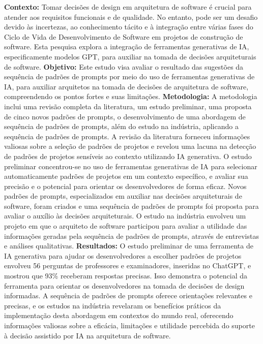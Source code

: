 \begin{abstractpt}
\textbf{Contexto:} Tomar decisões de design em arquitetura de software é crucial para atender aos requisitos funcionais e de qualidade. No entanto, pode ser um desafio devido às incertezas, ao conhecimento tácito e à integração entre várias fases do Ciclo de Vida de Desenvolvimento de Software em projetos de construção de software. Esta pesquisa explora a integração de ferramentas generativas de IA, especificamente modelos GPT, para auxiliar na tomada de decisões arquiteturais de software.
\textbf{Objetivo:} Este estudo visa avaliar o resultado das sugestões da sequência de padrões de prompts por meio do uso de ferramentas generativas de IA, para auxiliar arquitetos na tomada de decisões de arquitetura de software, compreendendo os pontos fortes e suas limitações.
\textbf{Metodologia:} A metodologia inclui uma revisão completa da literatura, um estudo preliminar, uma proposta de cinco novos padrões de prompts, o desenvolvimento de uma abordagem de sequência de padrões de prompts, além do estudo na indústria, aplicando a sequência de padrões de prompts. A revisão da literatura forneceu informações valiosas sobre a seleção de padrões de projetos e revelou uma lacuna na detecção de padrões de projetos sensíveis ao contexto utilizando IA generativa. O estudo preliminar concentrou-se no uso de ferramentas generativas de IA para selecionar automaticamente padrões de projetos em um contexto específico, e avaliar sua precisão e o potencial para orientar os desenvolvedores de forma eficaz. Novos padrões de prompts, especializados em auxiliar nas decisões arquiteturais de software, foram criados e uma sequência de padrões de prompts foi proposta para avaliar o auxílio às decisões arquiteturais. O estudo na indústria envolveu um projeto em que o arquiteto de software participou para avaliar a utilidade das informações geradas pela sequência de padrões de prompts, através de entrevistas e análises qualitativas.
\textbf{Resultados:} O estudo preliminar de uma ferramenta de IA generativa para ajudar os desenvolvedores a escolher padrões de projetos envolveu 56 perguntas de professores e examinadores, inseridas no ChatGPT, e mostrou que 93\% receberam respostas precisas. Isso demonstra o potencial da ferramenta para orientar os desenvolvedores na tomada de decisões de design informadas. A sequência de padrões de prompts oferece orientações relevantes e precisas, e os estudos na indústria revelaram os benefícios práticos da implementação desta abordagem em contextos do mundo real, oferecendo informações valiosas sobre a eficácia, limitações e utilidade percebida do suporte à decisão assistido por IA na arquitetura de software.
\end{abstractpt}
